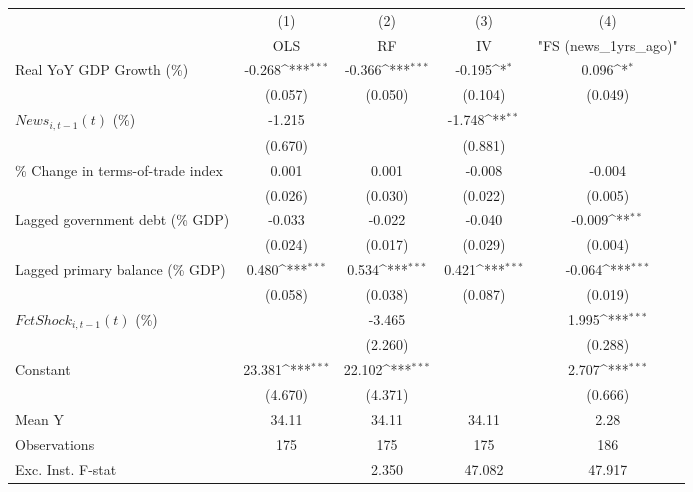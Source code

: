 {
\def\sym#1{\ifmmode^{#1}\else\(^{#1}\)\fi}
\begin{tabular}{l*{4}{c}}
\toprule
                    &\multicolumn{1}{c}{(1)}&\multicolumn{1}{c}{(2)}&\multicolumn{1}{c}{(3)}&\multicolumn{1}{c}{(4)}\\
                    &\multicolumn{1}{c}{OLS}&\multicolumn{1}{c}{RF}&\multicolumn{1}{c}{IV}&\multicolumn{1}{c}{ "FS (news_1yrs_ago)" }\\
\midrule
Real YoY GDP Growth (\%)&      -0.268\sym{***}&      -0.366\sym{***}&      -0.195\sym{*}  &       0.096\sym{*}  \\
                    &     (0.057)         &     (0.050)         &     (0.104)         &     (0.049)         \\
\addlinespace
$ News_{i,t-1}(t)$ (\%)&      -1.215         &                     &      -1.748\sym{**} &                     \\
                    &     (0.670)         &                     &     (0.881)         &                     \\
\addlinespace
\% Change in terms-of-trade index&       0.001         &       0.001         &      -0.008         &      -0.004         \\
                    &     (0.026)         &     (0.030)         &     (0.022)         &     (0.005)         \\
\addlinespace
Lagged government debt (\% GDP)&      -0.033         &      -0.022         &      -0.040         &      -0.009\sym{**} \\
                    &     (0.024)         &     (0.017)         &     (0.029)         &     (0.004)         \\
\addlinespace
Lagged primary balance (\% GDP)&       0.480\sym{***}&       0.534\sym{***}&       0.421\sym{***}&      -0.064\sym{***}\\
                    &     (0.058)         &     (0.038)         &     (0.087)         &     (0.019)         \\
\addlinespace
$ FctShock_{i,t-1}(t)$ (\%)&                     &      -3.465         &                     &       1.995\sym{***}\\
                    &                     &     (2.260)         &                     &     (0.288)         \\
\addlinespace
Constant            &      23.381\sym{***}&      22.102\sym{***}&                     &       2.707\sym{***}\\
                    &     (4.670)         &     (4.371)         &                     &     (0.666)         \\
\midrule
Mean Y              &       34.11         &       34.11         &       34.11         &        2.28         \\
Observations        &         175         &         175         &         175         &         186         \\
Exc. Inst. F-stat   &                     &       2.350         &      47.082         &      47.917         \\
\bottomrule
\end{tabular}
}
